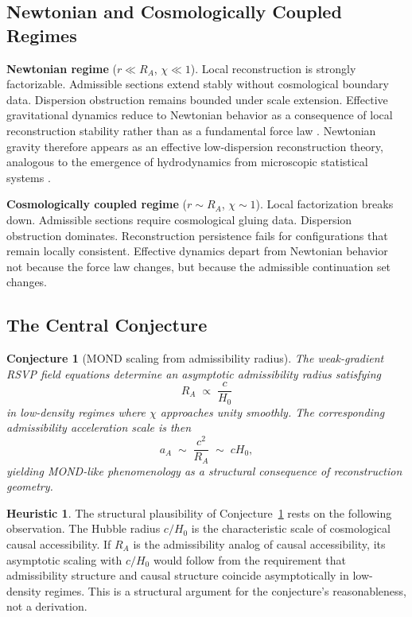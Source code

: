 \documentclass[11pt, a4paper]{article}
\theoremstyle{plain}
\newtheorem{conjecture}[theorem]{Conjecture}
\theoremstyle{definition}
\newtheorem{heuristic}[theorem]{Heuristic}
\theoremstyle{remark}
\newcommand{\RA}{R_{\!A}}
\newcommand{\aA}{a_{\!A}}
\begin{document}
\subsection{Newtonian and Cosmologically Coupled Regimes}

\medskip
\noindent\textbf{Newtonian regime} ($r \ll \RA$, $\chi \ll 1$).\quad
Local reconstruction is strongly factorizable. Admissible sections extend stably
without cosmological boundary data. Dispersion obstruction remains bounded under
scale extension. Effective gravitational dynamics reduce to Newtonian behavior as a
consequence of local reconstruction stability rather than as a fundamental force law
\cite{verlinde2011}. Newtonian gravity therefore appears as an effective
low-dispersion reconstruction theory, analogous to the emergence of hydrodynamics
from microscopic statistical systems \cite{goldenfeld1992}.

\medskip
\noindent\textbf{Cosmologically coupled regime} ($r \sim \RA$, $\chi \sim 1$).\quad
Local factorization breaks down. Admissible sections require cosmological gluing
data. Dispersion obstruction dominates. Reconstruction persistence fails for
configurations that remain locally consistent. Effective dynamics depart from
Newtonian behavior not because the force law changes, but because the admissible
continuation set changes.

\subsection{The Central Conjecture}

\begin{conjecture}[MOND scaling from admissibility radius]
\label{conj:RA}
The weak-gradient RSVP field equations determine an asymptotic admissibility radius
satisfying
\begin{equation}
  \RA \;\propto\; \frac{c}{H_0}
\end{equation}
in low-density regimes where $\chi$ approaches unity smoothly. The corresponding
admissibility acceleration scale is then
\begin{equation}
  \aA \;\sim\; \frac{c^2}{\RA} \;\sim\; cH_0,
\end{equation}
yielding MOND-like phenomenology as a structural consequence of reconstruction
geometry.
\end{conjecture}

\begin{heuristic}
The structural plausibility of Conjecture~\ref{conj:RA} rests on the following
observation. The Hubble radius $c/H_0$ is the characteristic scale of cosmological
causal accessibility. If $\RA$ is the admissibility analog of causal accessibility,
its asymptotic scaling with $c/H_0$ would follow from the requirement that
admissibility structure and causal structure coincide asymptotically in low-density
regimes. This is a structural argument for the conjecture's reasonableness, not a
derivation.
\end{heuristic}
\end{document}
